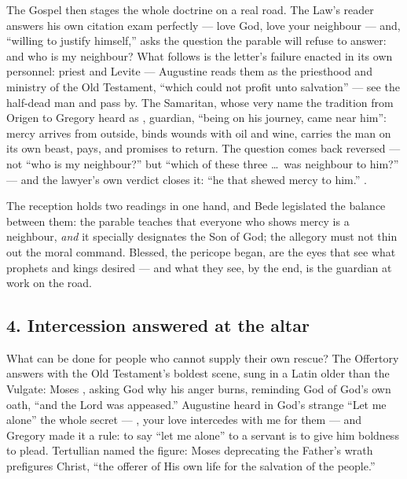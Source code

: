 The Gospel then stages the whole doctrine on a real road. The Law's reader
answers his own citation exam perfectly --- love God, love your neighbour ---
and, ``willing to justify himself,'' asks the question the parable will
refuse to answer: and who is my neighbour? What follows is the letter's
failure enacted in its own personnel: priest and Levite --- Augustine reads
them as the priesthood and ministry of the Old Testament, ``which could not
profit unto salvation'' --- see the half-dead man and pass by. The Samaritan,
whose very name the tradition from Origen to Gregory heard as ,
guardian, ``being on his journey, came near him'': mercy arrives from
outside, binds wounds with oil and wine, carries the man on its own beast,
pays, and promises to return. The question comes back reversed --- not
``who is my neighbour?'' but ``which of these three \dots\ was neighbour to
him?'' --- and the lawyer's own verdict closes it: ``he that shewed mercy to
him.'' .

The reception holds two readings in one hand, and Bede legislated the
balance between them: the parable teaches that everyone who shows mercy
is a neighbour, \textit{and} it specially designates the Son of God; the
allegory must not thin out the moral command. Blessed, the pericope began,
are the eyes that see what prophets and kings desired --- and what they see,
by the end, is the guardian at work on the road.

\subsection*{4. Intercession answered at the altar}

What can be done for people who cannot supply their own rescue? The
Offertory answers with the Old Testament's boldest scene, sung in a Latin
older than the Vulgate: Moses , asking God why
his anger burns, reminding God of God's own oath, ``and the Lord was
appeased.'' Augustine heard in God's strange ``Let me alone'' the whole
secret --- , your love
intercedes with me for them --- and Gregory made it a rule: to say ``let me
alone'' to a servant is to give him boldness to plead. Tertullian named the
figure: Moses deprecating the Father's wrath prefigures Christ, ``the
offerer of His own life for the salvation of the people.''

